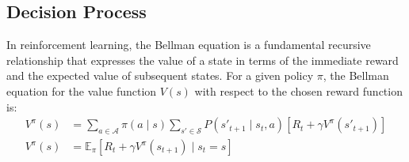 \subsection{Decision Process}
\label{subsec:decision-process}

In reinforcement learning, the Bellman equation is a fundamental recursive relationship that expresses the value of a
state in terms of the immediate reward and the expected value of subsequent states.
For a given policy $\pi$, the Bellman equation for the value function $V(s)$ with respect to the chosen reward function is:
\begin{equation*}
    \begin{aligned}
        V^\pi(s) &= \sum_{a \in \mathcal{A}} \pi(a \mid s) \sum_{s' \in \mathcal{S}} P(s'_{t+1} \mid s_{t}, a) \left[ R_t + \gamma V^\pi(s'_{t+1}) \right]\\
        V^\pi(s) &= \mathbb{E}_\pi \left[ R_t + \gamma V^\pi(s_{t+1}) \mid s_t = s \right]\\
    \end{aligned}
\end{equation*}

